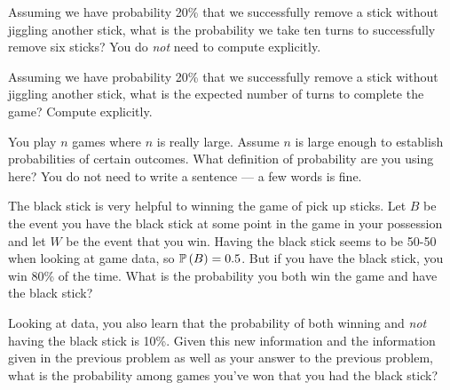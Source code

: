 \documentclass[12pt]{article}
\begin{document}

 Assuming we have probability 20\% that we successfully remove a stick without jiggling another stick, what is the probability we take ten turns to successfully remove six sticks? You do \textit{not} need to compute explicitly. 

 Assuming we have probability 20\% that we successfully remove a stick without jiggling another stick, what is the expected number of turns to complete the game? Compute explicitly. 

 You play $n$ games where $n$ is really large. Assume $n$ is large enough to establish probabilities of certain outcomes. What definition of probability are you using here? You do not need to write a sentence --- a few words is fine.

 The black stick is very helpful to winning the game of pick up sticks. Let $B$ be the event you have the black stick at some point in the game in your possession and let $W$ be the event that you win. Having the black stick seems to be 50-50 when looking at game data, so $\mathbb{P}\left(B\right) = 0.5$. But if you have the black stick, you win 80\% of the time. What is the probability you both win the game and have the black stick? 

 Looking at data, you also learn that the probability of both winning and \textit{not} having the black stick is 10\%. Given this new information and the information given in the previous problem as well as your answer to the previous problem, what is the probability among games you've won that you had the black stick?


\eenum
\end{document}
